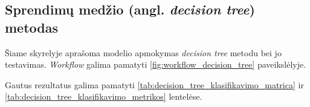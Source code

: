 \subsection{Sprendimų medžio (angl. \textit{decision tree}) metodas}
\label{subsec:decision_tree}

Šiame skyrelyje aprašoma modelio apmokymas \textit{decision tree} metodu bei jo testavimas. \textit{Workflow} galima pamatyti \ref{fig:workflow_decision_tree} paveikslėlyje.



Gautus rezultatus galima pamatyti \ref{tab:decision_tree_klasifikavimo_matrica} ir \ref{tab:decision_tree_klasifikavimo_metrikos} lentelėse.



